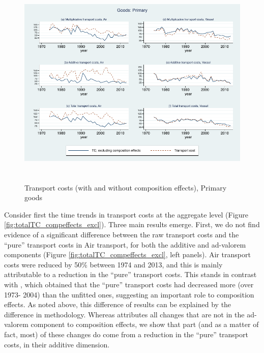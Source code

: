 \documentclass[a4paper,11pt]{article}
\begin{document}
\begin{figure}[htbp]
\caption{Transport costs (with and without composition effects), Primary goods}
\label{fig:totalTC_compeffects_excl_primary}
\begin{center}
\includegraphics[height=4in]
{graph_composition_primary.pdf}
\end{center}
\end{figure}

Consider first the time trends in transport costs at the aggregate level (Figure \ref{fig:totalTC_compeffects_excl}). Three main results emerge. First, we do not find evidence of a significant difference between the raw transport costs and the ``pure'' transport costs in Air transport, for both the additive and ad-valorem components (Figure \ref{fig:totalTC_compeffects_excl}, left panels). Air transport costs were reduced by 50\% between 1974 and 2013, and this is mainly attributable to a reduction in the ``pure'' transport costs. This stands in contrast with \citet{hummels2007}, which obtained that the ``pure'' transport costs had decreased more (over 1973- 2004) than the unfitted ones, suggesting an important role to composition effects. As noted above, this difference of results can be explained by the difference in methodology. Whereas \citet{hummels2007} attributes all changes that are not in the ad-valorem component to composition effects, we show that part (and as a matter of fact, most) of these changes do come from a reduction in the ``pure'' transport costs, in their additive dimension.
\end{document}
